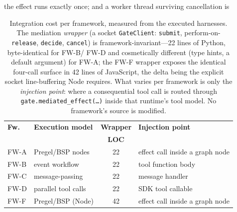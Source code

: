 \documentclass[10pt,journal,compsoc]{IEEEtran}
\begin{document}
the effect runs exactly once; and a worker thread surviving cancellation is
\begin{table}[!t]
\centering
\caption{Integration cost per framework, measured from the executed harnesses.
The mediation \emph{wrapper} (a socket \texttt{GateClient}: \texttt{submit},
perform-on-\texttt{release}, \texttt{decide}, \texttt{cancel}) is
framework-invariant---22 lines of Python, byte-identical for \textsf{FW-B}/%
\textsf{FW-D} and cosmetically different (type hints, a default argument) for
\textsf{FW-A}; the \textsf{FW-F} wrapper exposes the identical four-call
surface in 42 lines of JavaScript, the delta being the explicit socket
line-buffering Node requires. What varies per framework is only the
\emph{injection point}: where a consequential tool call is routed through
\texttt{gate.mediated\_effect(\dots)} inside that runtime's tool model. No
framework's source is modified.}
\label{tab:integration}
\renewcommand{\arraystretch}{1.2}
\footnotesize
\begin{tabularx}{\columnwidth}{@{}llcX@{}}
\toprule
\textbf{Fw.} & \textbf{Execution model} & \textbf{Wrapper} & \textbf{Injection point}\\
 & & \textbf{LOC} & \\
\midrule
FW-A & Pregel/BSP nodes    & 22 & effect call inside a graph node\\
FW-B & event workflow      & 22 & tool function body\\
FW-C & message-passing     & 22 & message handler\\
FW-D & parallel tool calls & 22 & SDK tool callable\\
FW-F & Pregel/BSP (Node)   & 42 & effect call inside a graph node\\
\bottomrule
\end{tabularx}
\end{table}
\end{document}
